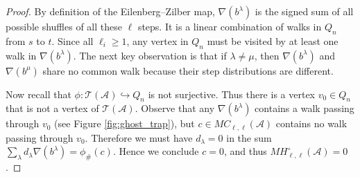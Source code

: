 \documentclass{amsart}
\numberwithin{equation}{section}
\theoremstyle{plain}
\theoremstyle{remark}
\theoremstyle{definition}
\numberwithin{equation}{section}
\newcommand{\A}{\mathcal{A}}
\newcommand{\T}{\mathcal{T}}
\begin{document}
\begin{proof}
    By definition of the Eilenberg--Zilber map, $\nabla(b^{\lambda})$ is the signed sum of all possible shuffles of all these $\ell$ steps. It is a linear combination of walks in $Q_n$ from $s$ to $t$.
    Since all $\ell_i\geq 1$, any vertex in $Q_n$ must be visited by at least one walk in $\nabla(b^{\lambda})$. The next key observation is that if $\lambda\neq \mu$, then $\nabla(b^{\lambda})$ and $\nabla(b^{\mu})$ share no common walk because their step distributions are different.

    Now recall that $\phi:\T(\A)\hookrightarrow Q_n$ is not surjective.
    Thus there is a vertex $v_0\in Q_n$ that is not a vertex of $\T(\A)$.
    Observe that any $\nabla(b^{\lambda})$ contains a walk passing through $v_0$ (see Figure \ref{fig:ghost_trap}), but $c\in MC_{\ell,\ell}(\A)$ contains no walk passing through $v_0$.
    Therefore we must have $d_{\lambda}=0$ in the sum $\sum_{\lambda}d_{\lambda}\nabla(b^{\lambda})=\phi_{\#}(c)$.
    Hence we conclude $c=0$, and thus $MH_{\ell,\ell}^{\circ}(\A)=0$.
\end{proof}
\end{document}
